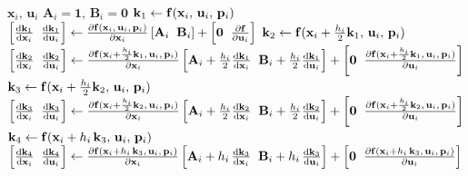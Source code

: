 \begin{algorithm}[H]
	\caption{\textsc{RK4-FAD}}\label{alg:rk4ad}
	\centering
	\footnotesize
	\begin{algorithmic}[1]
	\Require $\mathbf{x}_i,\,\mathbf{u}_i$
	\State $\mathbf{A}_i = \mathbf{1},\,\mathbf{B}_i = \mathbf{0}$
	\State $\mathbf{k}_1 \gets \mathbf{f}(\mathbf{x}_i,\, \mathbf{u}_i,\, \mathbf{p}_i)$
	\State $\left[\odv{\mathbf{k}_1}{\mathbf{x}_i} \hspace{0.2cm} \odv{\mathbf{k}_1}{\mathbf{u}_i}\right] \gets \pdv{\processModel{\mathbf{x}_i,\, \mathbf{u}_i,\, \mathbf{p}_i}}{\mathbf{x}_i} \left[\mathbf{A}_i \hspace{0.2cm} \mathbf{B}_i\right] + \left[\mathbf{0} \hspace{0.2cm} \pdv{\mathbf{f}}{\mathbf{u}_i}\right]$
	\State $\mathbf{k}_2 \gets \mathbf{f}(\mathbf{x}_i + \frac{h_i}{2}\mathbf{k}_1,\,\mathbf{u}_i,\,\mathbf{p}_i)$
	\State $\left[\odv{\mathbf{k}_2}{\mathbf{x}_i} \hspace{0.2cm} \odv{\mathbf{k}_2}{\mathbf{u}_i}\right] \gets \pdv{\processModel{\mathbf{x}_i + \frac{h_i}{2}\mathbf{k}_1,\,\mathbf{u}_i,\,\mathbf{p}_i}}{\mathbf{x}_i} \left[\mathbf{A}_i + \frac{h_i}{2} \odv{\mathbf{k}_1}{\mathbf{x}_i} \hspace{0.2cm} \mathbf{B}_i + \frac{h_i}{2} \odv{\mathbf{k}_1}{\mathbf{u}_i}\right] + \left[\mathbf{0} \hspace{0.2cm} \pdv{\processModel{\mathbf{x}_i + \frac{h_i}{2}\mathbf{k}_1,\,\mathbf{u}_i,\,\mathbf{p}_i}}{\mathbf{u}_i}\right]$
	\State $\mathbf{k}_3 \gets \mathbf{f}(\mathbf{x}_i + \frac{h_i}{2}\mathbf{k}_2,\, \mathbf{u}_i,\, \mathbf{p}_i)$
	\State $\left[\odv{\mathbf{k}_3}{\mathbf{x}_i} \hspace{0.2cm} \odv{\mathbf{k}_3}{\mathbf{u}_i}\right] \gets \pdv{\processModel{\mathbf{x}_i + \frac{h_i}{2}\mathbf{k}_2,\,\mathbf{u}_i,\,\mathbf{p}_i}}{\mathbf{x}_i} \left[\mathbf{A}_i + \frac{h_i}{2} \odv{\mathbf{k}_2}{\mathbf{x}_i} \hspace{0.2cm} \mathbf{B}_i + \frac{h_i}{2} \odv{\mathbf{k}_2}{\mathbf{u}_i}\right] + \left[\mathbf{0} \hspace{0.2cm} \pdv{\processModel{\mathbf{x}_i + \frac{h_i}{2}\mathbf{k}_2,\,\mathbf{u}_i,\,\mathbf{p}_i}}{\mathbf{u}_i}\right]$
	\State $\mathbf{k}_4 \gets \mathbf{f}(\mathbf{x}_i + h_i\,\mathbf{k}_3,\, \mathbf{u}_i,\, \mathbf{p}_i)$
	\State $\left[\odv{\mathbf{k}_4}{\mathbf{x}_i} \hspace{0.2cm} \odv{\mathbf{k}_4}{\mathbf{u}_i}\right] \gets \pdv{\processModel{\mathbf{x}_i + h_i \, \mathbf{k}_3,\, \mathbf{u}_i,\,\mathbf{p}_i}}{\mathbf{x}_i} \left[\mathbf{A}_i + h_i \, \odv{\mathbf{k}_3}{\mathbf{x}_i} \hspace{0.2cm} \mathbf{B}_i + h_i \, \odv{\mathbf{k}_3}{\mathbf{u}_i}\right] + \left[\mathbf{0} \hspace{0.2cm} \pdv{\processModel{\mathbf{x}_i + h_i \, \mathbf{k}_3,\,\mathbf{u}_i,\,\mathbf{p}_i}}{\mathbf{u}_i}\right]$

\end{algorithmic}
\end{algorithm}

